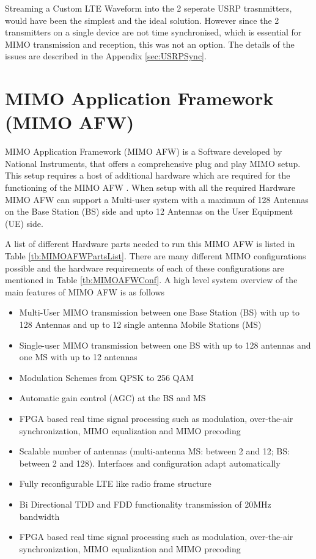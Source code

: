 Streaming a Custom LTE Waveform into the 2 seperate USRP trasnmitters, would have been the simplest and the ideal solution. However since the 2 transmitters on a single device are not time synchronised, which is essential for MIMO transmission and reception, this was not an option. The details of the issues are described in the Appendix \ref{sec:USRPSync}.

\section{MIMO Application Framework (MIMO AFW)}\label{sec:MIMOAFW}
MIMO Application Framework (MIMO AFW) is a Software developed by National Instruments, that offers a comprehensive plug and play MIMO setup. This setup requires a host of additional hardware which are required for the functioning of the MIMO AFW \cite{MIMOAFWGettingStarted}. When setup with all the required Hardware MIMO AFW can support a Multi-user system with a maximum of 128 Antennas on the Base Station (BS) side and upto 12 Antennas on the User Equipment (UE) side.

A list of different Hardware parts needed to run this MIMO AFW is listed in Table \ref{tb:MIMOAFWPartsList}. There are many different MIMO configurations possible and the hardware requirements of each of these configurations are mentioned in Table \ref{tb:MIMOAFWConf}. A high level system overview of the main features of MIMO AFW is as follows

\begin{itemize}

    \item Multi-User MIMO transmission between one Base Station (BS) with up to 128 Antennas and up to 12 single antenna Mobile Stations (MS)
    \item Single-user MIMO transmission between one BS with up to 128 antennas and one MS with up to 12 antennas
    \item Modulation Schemes from QPSK to 256 QAM
    \item Automatic gain control (AGC) at the BS and MS
    \item FPGA based real time signal processing such as modulation, over-the-air synchronization, MIMO equalization and MIMO precoding
    \item Scalable number of antennas (multi-antenna MS: between 2 and 12; BS: between 2 and 128). Interfaces and configuration adapt automatically
    \item Fully reconfigurable LTE like radio frame structure
    \item Bi Directional TDD and FDD functionality transmission of 20MHz bandwidth
    \item FPGA based real time signal processing such as modulation, over-the-air synchronization, MIMO equalization and MIMO precoding
\end{itemize}


